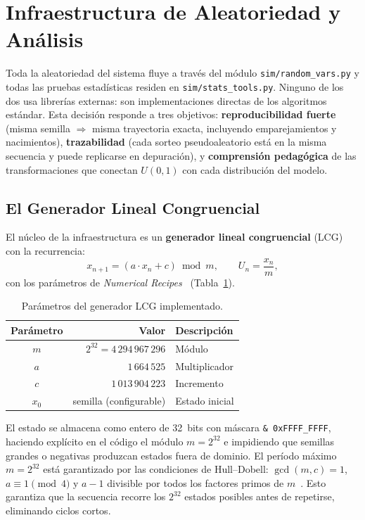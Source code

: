 \documentclass{llncs}
\begin{document}
\section{Infraestructura de Aleatoriedad y Análisis}
\label{sec:infra}

Toda la aleatoriedad del sistema fluye a través del módulo
\texttt{sim/random\_vars.py} y todas las pruebas estadísticas residen en
\texttt{sim/stats\_tools.py}.
Ninguno de los dos usa librerías externas: son implementaciones directas de
los algoritmos estándar.
Esta decisión responde a tres objetivos:
\textbf{reproducibilidad fuerte} (misma semilla $\Rightarrow$ misma
trayectoria exacta, incluyendo emparejamientos y nacimientos),
\textbf{trazabilidad} (cada sorteo pseudoaleatorio está en la misma
secuencia y puede replicarse en depuración), y
\textbf{comprensión pedagógica} de las transformaciones que conectan
$U(0,1)$ con cada distribución del modelo.

\subsection{El Generador Lineal Congruencial}

El núcleo de la infraestructura es un \textbf{generador lineal congruencial}
(LCG) con la recurrencia:
\[
  x_{n+1} = (a \cdot x_n + c) \bmod m, \qquad U_n = \frac{x_n}{m},
\]
con los parámetros de \emph{Numerical Recipes}~\cite{press1992}
(Tabla~\ref{tab:lcg}).

\begin{table}[H]
\caption{Parámetros del generador LCG implementado.}
\label{tab:lcg}
\centering
\begin{tabular}{crl}
\toprule
\textbf{Parámetro} & \textbf{Valor} & \textbf{Descripción} \\
\midrule
$m$ & $2^{32} = 4\,294\,967\,296$ & Módulo \\
$a$ & $1\,664\,525$               & Multiplicador \\
$c$ & $1\,013\,904\,223$          & Incremento \\
$x_0$ & semilla (configurable)    & Estado inicial \\
\bottomrule
\end{tabular}
\end{table}

El estado se almacena como entero de 32~bits con máscara
\texttt{\& 0xFFFF\_FFFF}, haciendo explícito en el código el módulo
$m = 2^{32}$ e impidiendo que semillas grandes o negativas produzcan estados
fuera de dominio.
El período máximo $m = 2^{32}$ está garantizado por las condiciones de
Hull--Dobell: $\gcd(m, c) = 1$, $a \equiv 1 \pmod{4}$ y $a - 1$ divisible
por todos los factores primos de $m$~\cite{knuth1997}.
Esto garantiza que la secuencia recorre los $2^{32}$ estados posibles antes
de repetirse, eliminando ciclos cortos.
\end{document}
